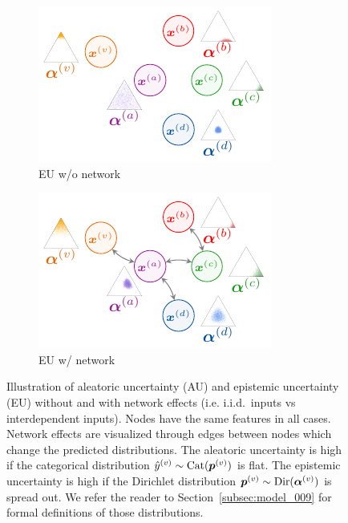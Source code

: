 \begin{figure}
\begin{subfigure}[t]{0.24\textwidth}
		\includegraphics[width=\textwidth]{sections/009_neurips2021/resources/no-network-epistemic.pdf}
		\caption{EU w/o network}
		\label{subfig:eu_without_network}
	\end{subfigure}
	\begin{subfigure}[t]{0.24\textwidth}
	    \centering
		\includegraphics[width=\textwidth]{sections/009_neurips2021/resources/network-epistemic.pdf}
		\caption{EU w/ network}
		\label{subfig:eu_with_network}
	\end{subfigure}
	\caption{Illustration of aleatoric uncertainty (AU) and epistemic uncertainty (EU) without and with network effects (i.e. i.i.d.\ inputs vs interdependent inputs). Nodes have the same features in all cases. Network effects are visualized through edges between nodes which change the predicted distributions. The aleatoric uncertainty is high if the categorical distribution $\hat{y} ^{(v)} \sim \operatorname{Cat}(\bm{p}^{(v)})$ is flat. The epistemic uncertainty is high if the Dirichlet distribution $\bm{p}^{(v)} \sim \operatorname{Dir}(\bm{\alpha}^{(v)})$ is spread out. We refer the reader to Section~\ref{subsec:model_009} for formal definitions of those distributions.}
    \label{fig:uncertainty_types_small}
\end{figure}

